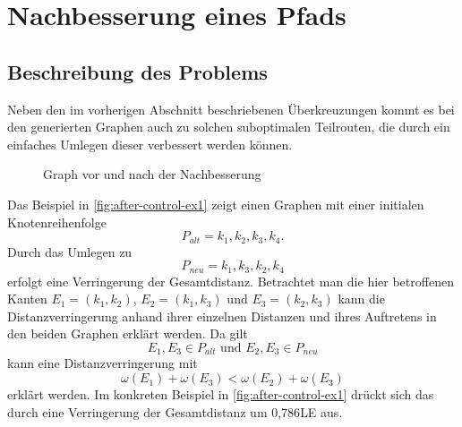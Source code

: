 \section{Nachbesserung eines Pfads}
\label{sec:after-control}
\subsection{Beschreibung des Problems}
Neben den im vorherigen Abschnitt beschriebenen Überkreuzungen kommt es bei den generierten Graphen auch zu solchen suboptimalen Teilrouten, die durch ein einfaches Umlegen dieser verbessert werden können.

\begin{figure}[h]
    \begin{center}
    
    \hfil
    \end{center}
    \caption{Graph vor und nach der Nachbesserung}
    \label{fig:after-control-ex1}
\end{figure}

Das Beispiel in \vref{fig:after-control-ex1} zeigt einen Graphen mit einer initialen Knotenreihenfolge
$$P_{alt} = k_1,k_2,k_3,k_4\textrm{.}$$
Durch das Umlegen zu
$$P_{neu} =k_1,k_3,k_2,k_4$$
erfolgt eine Verringerung der Gesamtdistanz.
Betrachtet man die hier betroffenen Kanten $E_1 = (k_1,k_2)$, $ E_2 = (k_1,k_3)$ und $E_3=(k_2,k_3)$ kann die Distanzverringerung anhand ihrer einzelnen Distanzen und ihres Auftretens in den beiden Graphen erklärt werden.
Da gilt 
$$E_1,E_3\in P_{alt} \textrm{ und } E_2,E_3 \in P_{neu}$$
kann eine Distanzverringerung mit
$$\omega(E_1) + \omega(E_3) < \omega(E_2) + \omega(E_3)$$
erklärt werden.
Im konkreten Beispiel in \vref{fig:after-control-ex1} drückt sich das durch eine Verringerung der Gesamtdistanz um 0,786\ac{LE} aus.


